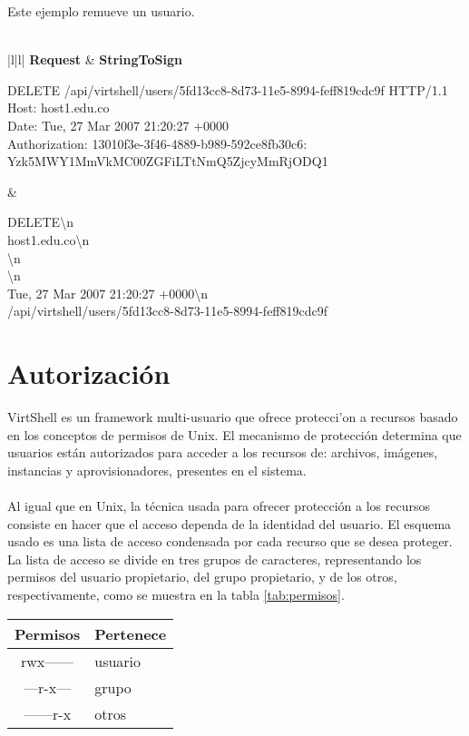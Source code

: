 Este ejemplo remueve un usuario.\\
\\
\vspace{1cm}
\scriptsize
{}
\begin{tabular}{|l|l|} \hline
\textbf{Request} & \textbf{StringToSign} \\ \hline
{}%
{\raggedright DELETE /api/virtshell/users/5fd13cc8-8d73-11e5-8994-feff819cdc9f HTTP/1.1 \\
 Host: host1.edu.co \\
 Date: Tue, 27 Mar 2007 21:20:27 +0000 \\
 Authorization: 13010f3e-3f46-4889-b989-592ce8fb30c6: Yzk5MWY1MmVkMC00ZGFiLTtNmQ5ZjcyMmRjODQ1 } & %
{\raggedright DELETE\textbackslash{}n \\
 host1.edu.co\textbackslash{}n \\
 \textbackslash{}n \\
 \textbackslash{}n \\
 Tue, 27 Mar 2007 21:20:27 +0000\textbackslash{}n \\ /api/virtshell/users/5fd13cc8-8d73-11e5-8994-feff819cdc9f} \tabularnewline \hline
\end{tabular}

\normalsize
\section{Autorización}
VirtShell es un framework multi-usuario que ofrece protecci'on a recursos basado en los conceptos de permisos de Unix. El mecanismo de protección determina que usuarios están autorizados para acceder a los recursos de: archivos, imágenes, instancias y aprovisionadores, presentes en el sistema. \\
\\
Al igual que en Unix, la técnica usada para ofrecer protección a los recursos consiste en hacer que el acceso dependa de la identidad del usuario. El esquema usado es una lista de acceso condensada por cada recurso que se desea proteger. La lista de acceso se divide en tres grupos de caracteres, representando los permisos del usuario propietario, del grupo propietario, y de los otros, respectivamente, como se muestra en la tabla \ref{tab:permisos}.

\begin{center}
 \label{tab:permisos}
 \begin{tabular}{| c | p{2.2cm} |}
 \hline
  \rowcolor{blueapi}
  \textbf{Permisos} & \textbf{Pertenece}  \\ [0.2ex] 
  \hline\hline
  rwx------ &  usuario \\
  \hline
  ---r-x--- & grupo \\  
  \hline
  ------r-x & otros \\
  \hline
\end{tabular}
\end{center}

